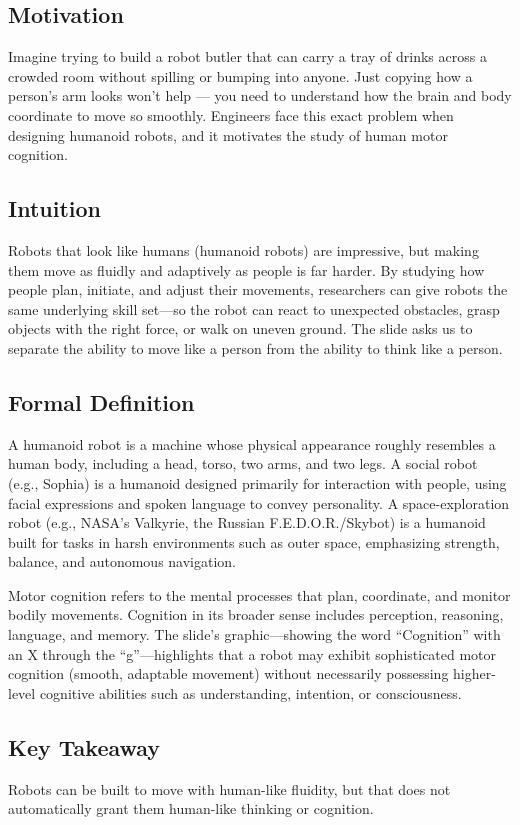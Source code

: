 \documentclass[12pt, a4paper]{article}
\begin{document}
\subsection{Motivation}
Imagine trying to build a robot butler that can carry a tray of drinks across a crowded room without spilling or bumping into anyone. Just copying how a person's arm looks won't help --- you need to understand how the brain and body coordinate to move so smoothly. Engineers face this exact problem when designing humanoid robots, and it motivates the study of human motor cognition.

\subsection{Intuition}
Robots that look like humans (humanoid robots) are impressive, but making them move as fluidly and adaptively as people is far harder. By studying how people plan, initiate, and adjust their movements, researchers can give robots the same underlying skill set---so the robot can react to unexpected obstacles, grasp objects with the right force, or walk on uneven ground. The slide asks us to separate the ability to move like a person from the ability to think like a person.

\subsection{Formal Definition}
A humanoid robot is a machine whose physical appearance roughly resembles a human body, including a head, torso, two arms, and two legs. A social robot (e.g., Sophia) is a humanoid designed primarily for interaction with people, using facial expressions and spoken language to convey personality. A space-exploration robot (e.g., NASA's Valkyrie, the Russian F.E.D.O.R./Skybot) is a humanoid built for tasks in harsh environments such as outer space, emphasizing strength, balance, and autonomous navigation.  

Motor cognition refers to the mental processes that plan, coordinate, and monitor bodily movements. Cognition in its broader sense includes perception, reasoning, language, and memory. The slide's graphic---showing the word ``Cognition'' with an X through the ``g''---highlights that a robot may exhibit sophisticated motor cognition (smooth, adaptable movement) without necessarily possessing higher-level cognitive abilities such as understanding, intention, or consciousness.

\subsection{Key Takeaway}
Robots can be built to move with human-like fluidity, but that does not automatically grant them human-like thinking or cognition.
\end{document}

